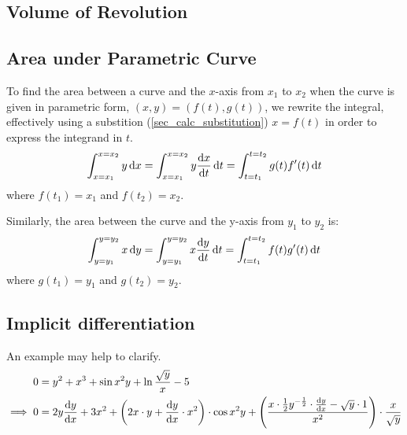 \documentclass[fleqn,a4paper,11pt]{article}
\begin{document}
    \subsection{Volume of Revolution}

    \subsection{Area under Parametric Curve} \label{sec_calc_parametric_area}

    To find the area between a curve and the \(x\)-axis from \(x_1\) to \(x_2\)
    when the curve is given in parametric form, \((x, y) = (f(t), g(t))\),
    we rewrite the integral, effectively using a substition
    (\ref{sec_calc_substitution}) \(x = f(t)\) in order to express the integrand
    in \(t\).
    \begin{equation}
    \int_{x=x_1}^{x=x_2} y \dd{x} =
     \int_{x=x_1}^{x=x_2} y \dv{x}{t} \dd{t} =
     \int_{t=t_1}^{t=t_2} g(t)f'(t) \dd{t}
    \end{equation}
    where \(f(t_1) = x_1\) and \(f(t_2) = x_2\).

    Similarly, the area between the curve and the y-axis from \(y_1\) to \(y_2\)
    is:
    \begin{equation}
    \int_{y=y_1}^{y=y_2} x \dd{y} =
     \int_{y=y_1}^{y=y_2} x \dv{y}{t} \dd{t} =
     \int_{t=t_1}^{t=t_2} f(t)g'(t) \dd{t}
    \end{equation}
    where \(g(t_1) = y_1\) and \(g(t_2) = y_2\).

    \subsection{Implicit differentiation}



    An example may help to clarify.
    \begin{align*}
    0 &= y^2 + x^3 + \sin x^2 y + \ln \frac{\sqrt y} x - 5 \\
    \implies 0 &=
                2y \dv{y}{x} + 3x^2 +
                \pqty{2x \cdot y + \dv{y}{x} \cdot x^2} \cdot \cos x^2 y +
                \pqty{\frac{x \cdot \frac 12 y^{-\frac 12} \cdot \dv{y}{x} -
                            \sqrt y \cdot 1}
                           {x^2}} \cdot \frac{x}{\sqrt y} \\
    \end{align*}
\end{document}
